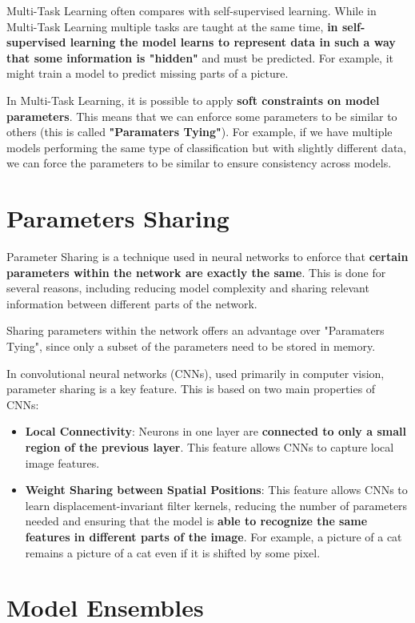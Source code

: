 Multi-Task Learning often compares with self-supervised learning. While in Multi-Task Learning multiple tasks are taught at the same time, \textbf{in self-supervised learning the model learns to represent data in such a way that some information is "hidden"} and must be predicted. For example, it might train a model to predict missing parts of a picture.

In Multi-Task Learning, it is possible to apply \textbf{soft constraints on model parameters}. This means that we can enforce some parameters to be similar to others (this is called \textbf{"Paramaters Tying"}). For example, if we have multiple models performing the same type of classification but with slightly different data, we can force the parameters to be similar to ensure consistency across models.

\section{Parameters Sharing}

Parameter Sharing is a technique used in neural networks to enforce that \textbf{certain parameters within the network are exactly the same}. This is done for several reasons, including reducing model complexity and sharing relevant information between different parts of the network.

Sharing parameters within the network offers an advantage over "Paramaters Tying", since only a subset of the parameters need to be stored in memory.

In convolutional neural networks (CNNs), used primarily in computer vision, parameter sharing is a key feature. This is based on two main properties of CNNs:

\begin{itemize}
    \item \textbf{Local Connectivity}: Neurons in one layer are \textbf{connected to only a small region of the previous layer}. This feature allows CNNs to capture local image features.
    \item \textbf{Weight Sharing between Spatial Positions}: This feature allows CNNs to learn displacement-invariant filter kernels, reducing the number of parameters needed and ensuring that the model is \textbf{able to recognize the same features in different parts of the image}. For example, a picture of a cat remains a picture of a cat even if it is shifted by some pixel. 
\end{itemize}

\section{Model Ensembles}

